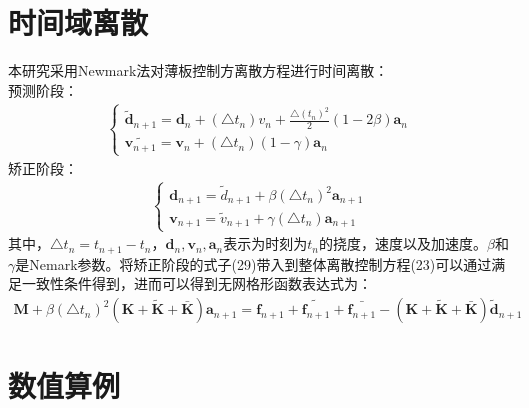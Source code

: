 \documentclass[11pt,a4paper]{article}
\begin{document}
\section{时间域离散}
本研究采用Newmark法对薄板控制方离散方程进行时间离散：\\
预测阶段：
\begin{equation}
 \begin{split}
    \begin{cases}
        \tilde{\pmb{d}}_{n+1}=\pmb{d}_n+(\triangle t_n)v_n+\frac{\triangle (t_n)^2}{2}(1-2\beta)\pmb a_n\\
        \tilde{\pmb v_{n+1}}=\pmb{v}_n+(\triangle t_n)(1-\gamma)\pmb{a}_n
    \end{cases}
  \end{split}
\end{equation}
矫正阶段：
\begin{equation}
\begin{split}
    \begin{cases}
    \pmb{d}_{n+1}=\tilde{d}_{n+1}+\beta(\triangle t_n)^2\pmb a_{n+1}\\
    \pmb v_{n+1}=\tilde{v}_{n+1}+\gamma(\triangle t_n)\pmb{a}_{n+1}
    \end{cases}
\end{split}
\end{equation}
其中，$\triangle t_n=t_{n+1}-t_n$，$\pmb{d}_n,\pmb{v}_n,\pmb a_n$表示为时刻为$t_n$的挠度，速度以及加速度。$\beta$和$\gamma$是Nemark参数。将矫正阶段的式子(29)带入到整体离散控制方程(23)可以通过满足一致性条件得到，进而可以得到无网格形函数表达式为：
\begin{equation}
\begin{split}
\pmb{M}+\beta(\triangle t_n)^2(\pmb{K}+\pmb{\tilde{K}}+\pmb{\bar{K}})\pmb{a}_{n+1}=\pmb{f}_{n+1}+\tilde{\pmb{f}_{n+1}}+\bar{\pmb{f}_{n+1}}-(\pmb{K}+\pmb{\tilde{K}}+\pmb{\bar{K}})\pmb{\tilde{d}}_{n+1}
\end{split}
\end{equation}






    \section{数值算例}
\end{document}
